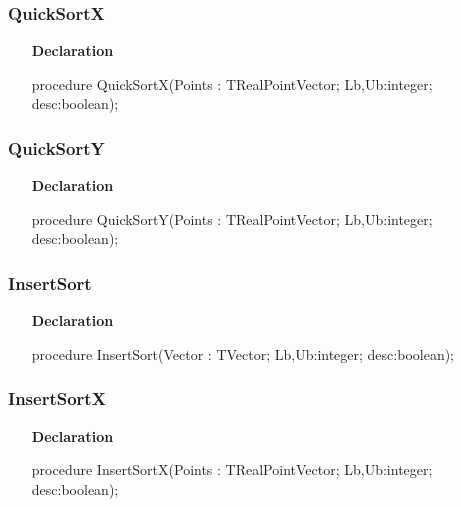 \documentclass[12pt,a4paper,oneside]{report}
\newcommand{\declarationitem}[1]{\textbf{#1}}
\begin{document}
\subsubsection{QuickSortX}
\label{lmsorting-QuickSortX}
\begin{itemize}\item[\declarationitem{Declaration}\hfill]
	\begin{flushleft}
		\begin{ttfamily}
			procedure QuickSortX(Points : TRealPointVector; Lb,Ub:integer; desc:boolean);\end{ttfamily}
		
	\end{flushleft}
	
\end{itemize}
\subsubsection{QuickSortY}
\label{lmsorting-QuickSortY}
\begin{itemize}\item[\declarationitem{Declaration}\hfill]
	\begin{flushleft}
		\begin{ttfamily}
			procedure QuickSortY(Points : TRealPointVector; Lb,Ub:integer; desc:boolean);\end{ttfamily}
		
	\end{flushleft}
	
\end{itemize}
\subsubsection{InsertSort}
\label{lmsorting-InsertSort}
\begin{itemize}\item[\declarationitem{Declaration}\hfill]
	\begin{flushleft}
		\begin{ttfamily}
			procedure InsertSort(Vector : TVector; Lb,Ub:integer; desc:boolean);\end{ttfamily}
		
	\end{flushleft}
	
\end{itemize}
\subsubsection{InsertSortX}
\label{lmsorting-InsertSortX}
\begin{itemize}\item[\declarationitem{Declaration}\hfill]
	\begin{flushleft}
		\begin{ttfamily}
			procedure InsertSortX(Points : TRealPointVector; Lb,Ub:integer; desc:boolean);\end{ttfamily}
		
	\end{flushleft}
	
\end{itemize}
\end{document}
